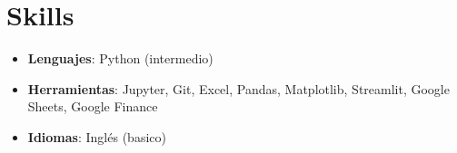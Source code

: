 \documentclass[11pt, a4paper]{article}
\newcommand{\cvitem}[2]{\textbf{#1} \hfill \color{secondary}#2} %
\begin{document}

\section*{Skills}
\begin{itemize}[leftmargin=*]
    \item \textbf{Lenguajes}: Python (intermedio)
    \item \textbf{Herramientas}: Jupyter, Git, Excel, Pandas, Matplotlib, Streamlit, Google Sheets, Google Finance
    \item \textbf{Idiomas}: Inglés (basico)
\end{itemize}

\end{document}
